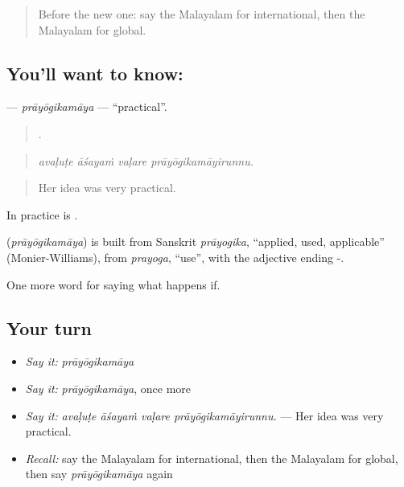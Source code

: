 \label{lesson:ML-C460-prayogikamaya}



\begin{quote}
Before the new one: say the Malayalam for international, then the Malayalam for global.
\end{quote}

\subsection*{You'll want to know: }
\textbf{} — \emph{prāyōgikamāya} — \textquotedblleft{}practical\textquotedblright{}.

\begin{quote}
   .
\end{quote}

\begin{quote}
\emph{avaḷuṭe āśayaṁ vaḷare prāyōgikamāyirunnu.}
\end{quote}

\begin{quote}
Her idea was very practical.
\end{quote}

In practice is .

\begin{cousinweb}
\textbf{} (\emph{prāyōgikamāya}) is built from Sanskrit \emph{prāyogika}, \textquotedblleft{}applied, used, applicable\textquotedblright{} (Monier-Williams), from \emph{prayoga}, \textquotedblleft{}use\textquotedblright{}, with the adjective ending -.
\end{cousinweb}

\begin{grammarlens}[title={What you've built}]
One more word for saying what happens if.
\end{grammarlens}

\subsection*{Your turn}
\begin{itemize}
\raggedright
  \item \emph{Say it:} \emph{prāyōgikamāya}
  \item \emph{Say it:} \emph{prāyōgikamāya}, once more
  \item \emph{Say it:} \emph{avaḷuṭe āśayaṁ vaḷare prāyōgikamāyirunnu.} — Her idea was very practical.
  \item \emph{Recall:} say the Malayalam for international, then the Malayalam for global, then say \emph{prāyōgikamāya} again
\end{itemize}

